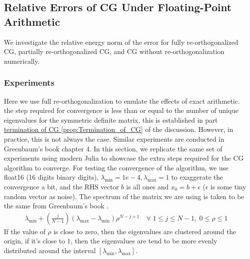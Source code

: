 \documentclass[]{article}
\theoremstyle{definition}
\begin{document}
    \subsection{Relative Errors of CG Under Floating-Point Arithmetic}
        We investigate the relative energy norm of the error for fully re-orthogonalized CG, partially re-orthogonalized CG, and CG without re-orthogonalization numerically. 
        \subsubsection{Experiments}
            Here we use full re-orthogonalization to emulate the effects of exact arithmetic. the step required for convergence is less than or equal to the number of unique eigenvalues for the symmetric definite matrix, this is established in part \hyperref[prop:Termination_of_CG]{termination of CG \ref*{prop:Termination_of_CG}} of the discussion. However, in practice, this is not always the case. Similar experiments are conducted in Greenbaum's book chapter\cite{book:greenbaum} 4. In this section, we replicate the same set of experiments using modern Julia to showcase the extra steps required for the CG algorithm to converge. For testing the convergence of the algorithm, we use float16 (16 digits binary digits), $\lambda_{\min} = 1e-4, \lambda_{\max} = 1$ to exaggerate the convergence a bit, and the RHS vector $b$ is all ones and $x_0 = b + \epsilon$ ($\epsilon$ is some tiny random vector as noise). The spectrum of the matrix we are using is taken to be the same from Greenbaum's book \cite{book:greenbaum}. 
            \begin{align}\label{eqn:paramaterized_experiment_matrix}
                \lambda_{\min} + \left(
                    \frac{j}{N - 1}
                \right)(\lambda_{\max} - \lambda_{\min})\rho^{N - j + 1}\quad \forall\; 1 \le j \le N - 1, \; 0 \le \rho \le 1
            \end{align}
            If the value of $\rho$ is close to zero, then the eigenvalues are clustered around the origin, if it's close to $1$, then the eigenvalues are tend to be more evenly distributed around the interval $[\lambda_{\min}, \lambda_{\max}]$. 
\end{document}
